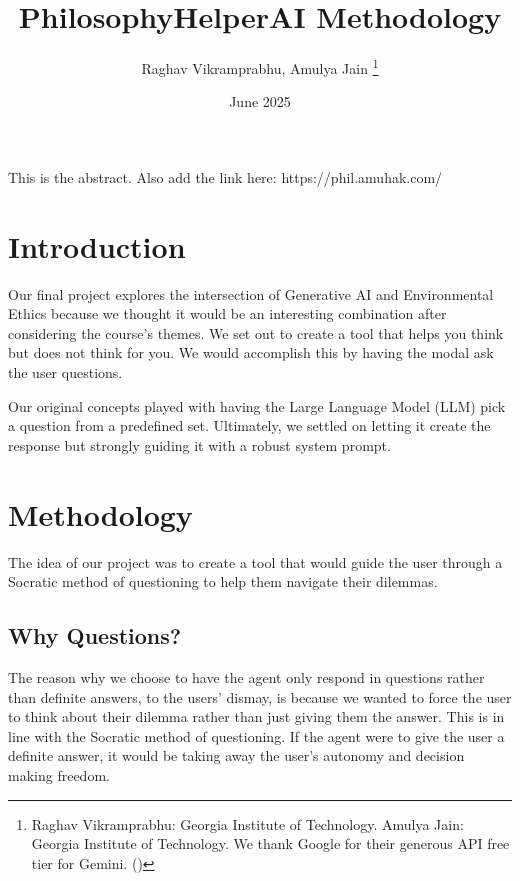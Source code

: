 \documentclass[letterpaper,11pt,leqno]{article}
\begin{document}
\title{PhilosophyHelperAI Methodology}

\author{Raghav Vikramprabhu, Amulya Jain
  \thanks{Raghav Vikramprabhu: Georgia Institute of Technology. Amulya Jain: Georgia Institute of Technology. We thank Google for their generous API free tier for Gemini. (\cite{GoogleAIDev}) }}

\date{June 2025}


\begin{titlepage}
  \maketitle

  This is the abstract. Also add the link here: https://phil.amuhak.com/

\end{titlepage}

\section{Introduction}\label{s:introduction}

Our final project explores the intersection of Generative AI and Environmental Ethics because we thought it would be an interesting combination after considering the course's themes. We set out to create a tool that helps you think but does not think for you. We would accomplish this by having the modal ask the user questions.

Our original concepts played with having the Large Language Model (LLM) pick a question from a predefined set. Ultimately, we settled on letting it create the response but strongly guiding it with a robust system prompt.

\section{Methodology}
The idea of our project was to create a tool that would guide the user through a Socratic method of questioning to help them navigate their dilemmas.

\subsection{Why Questions?}
The reason why we choose to have the agent only respond in questions rather than definite answers, to the users' dismay, is because we wanted to force the user to think about their dilemma rather than just giving them the answer. This is in line with the Socratic method of questioning. If the agent were to give the user a definite answer, it would be taking away the user's autonomy and decision making freedom.
\end{document}
